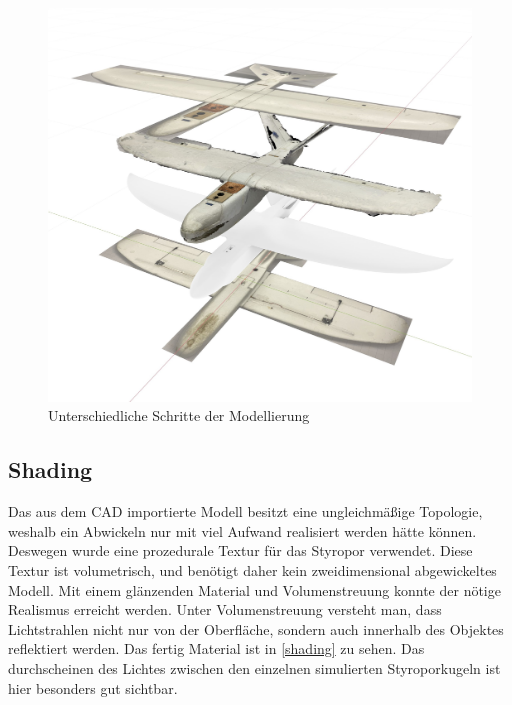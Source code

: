 \begin{figure}[H]
\begin{center}
\includegraphics[width=\textwidth]{gfx/prod/plane/plane5.jpg}
\caption{Unterschiedliche Schritte der Modellierung}
\label{drohne_modell}
\end{center}
\end{figure}

\subsection{Shading}

Das aus dem CAD importierte Modell besitzt eine ungleichmäßige Topologie, weshalb ein Abwickeln nur mit viel Aufwand realisiert werden hätte können. Deswegen wurde eine prozedurale Textur für das Styropor verwendet. Diese Textur ist volumetrisch, und benötigt daher kein zweidimensional abgewickeltes Modell. Mit einem glänzenden Material und Volumenstreuung konnte der nötige Realismus erreicht werden. Unter Volumenstreuung versteht man, dass Lichtstrahlen nicht nur von der Oberfläche, sondern auch innerhalb des Objektes reflektiert werden. Das fertig Material ist in \autoref{shading} zu sehen. Das durchscheinen des Lichtes zwischen den einzelnen simulierten Styroporkugeln ist hier besonders gut sichtbar.

